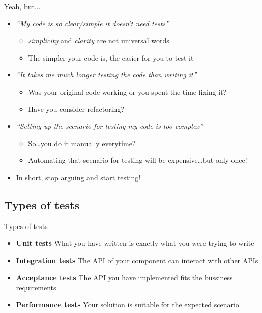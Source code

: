 \documentclass[aspectratio=169]{beamer}
\begin{document}
\begin{frame}{Yeah, but...}
    \begin{itemize}
    \item \textit{``My code is so clear/simple it doesn't need tests''}
        \begin{itemize}
        \pause
        \item \emph{simplicity} and \emph{clarity} are not universal words
        \pause
        \item The simpler your code is, the easier for you to test it
        \end{itemize}
    \pause
    \item \textit{``It takes me much longer testing the code than writing it''}
        \begin{itemize}
        \pause
        \item Was your original code working or you spent the time fixing it?
        \pause
        \item Have you consider refactoring?
        \end{itemize}
    \pause
    \item \textit{``Setting up the scenario for testing my code is too complex''}
        \begin{itemize}
        \pause
        \item So\dots you do it manually everytime?
        \pause
        \item Automating that scenario for testing will be expensive\dots but only once!
        \end{itemize}
    \pause
    \item In short, stop arguing and start testing!
    \end{itemize}
\end{frame}

\subsection*{Types of tests}
\label{types_of_tests}

\begin{frame}{Types of tests}
    \begin{itemize}
    \item \textbf{Unit tests} What you have written is exactly what you were trying to write
    \item \textbf{Integration tests} The API of your component can interact with other APIs
    \item \textbf{Acceptance tests} The API you have implemented fits the bussiness requirements
    \item \textbf{Performance tests} Your solution is suitable for the expected scenario
    \end{itemize}
\end{frame}
\end{document}
